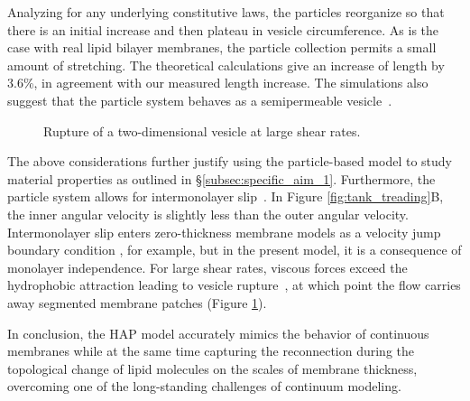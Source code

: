 Analyzing for any underlying constitutive laws, the particles reorganize
so that there is an initial increase and then plateau in vesicle
circumference. As is the case with real lipid bilayer membranes, the
particle collection permits a small amount of stretching. The
theoretical calculations give an increase of length by 3.6\%, in
agreement with our measured length increase. The simulations also
suggest that the particle system behaves as a semipermeable
vesicle~\cite{323e9a2f0c58487ea82518d7a1f96485, YAO2017728}.


\begin{figure}
 \vspace{-3pt}
 \vspace{-7pt}
  \caption{\label{fig:flow_rupture} \footnotesize Rupture of a
  two-dimensional vesicle at large shear rates.}
\end{figure}
The above considerations further justify using the particle-based model
to study material properties as outlined in
\S\ref{subsec:specific_aim_1}. Furthermore, the particle system allows
for intermonolayer slip~\cite{SHKULIPA2005823, ShkulipaThesis}. In
Figure \ref{fig:tank_treading}B, the inner angular velocity is slightly
less than the outer angular velocity. Intermonolayer slip enters
zero-thickness membrane models as a velocity jump boundary condition
\cite{schwalbe_vlahovska_miksis_2010}, for example, but in the present
model, it is a consequence of monolayer independence. For large shear
rates, viscous forces exceed the hydrophobic attraction leading to
 vesicle rupture~\cite{C8SM01501E}, at which point the flow carries away
 segmented membrane patches (Figure \ref{fig:flow_rupture}). 

In conclusion, the HAP model accurately mimics the behavior of continuous
membranes while at the same time capturing the
reconnection during the topological change of 
lipid molecules on the scales of membrane thickness,
overcoming one of the long-standing challenges of continuum modeling.

